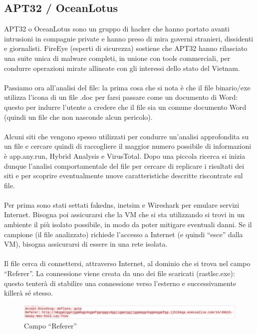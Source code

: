 \documentclass[8pt]{extarticle}
\begin{document}
\subsection{APT32 / OceanLotus}
\noindent
APT32 o OceanLotus sono un gruppo di hacker che hanno portato avanti intrusioni in compagnie private 
e hanno preso di mira governi stranieri, dissidenti e giornalisti. FireEye (esperti di sicurezza) 
sostiene che APT32 hanno rilasciato una suite unica di malware completi, in unione con tools commerciali, 
per condurre operazioni mirate allineate con gli interessi dello stato del Vietnam. \\\\
Passiamo ora all’analisi del file: la prima cosa che si nota è che il file binario/exe utilizza 
l’icona di un file .doc per farsi passare come un documento di Word: questo per indurre l’utente a 
credere che il file sia un comune documento Word (quindi un file che non nasconde alcun pericolo). \\\\
Alcuni siti che vengono spesso utilizzati per condurre un’analisi approfondita su un file e cercare 
quindi di raccogliere il maggior numero possibile di informazioni è app.any.run, Hybrid Analysis e 
VirusTotal. Dopo una piccola ricerca si inizia dunque l’analisi comportamentale del file per cercare 
di replicare i risultati dei siti e per scoprire eventualmente nuove caratteristiche descritte 
riscontrate sul file.\\\\
Per prima sono stati settati fakedns, inetsim e Wireshark per emulare servizi Internet. Bisogna 
poi assicurarsi che la VM che si sta utilizzando si trovi in un ambiente il più isolato possibile, 
in modo da poter mitigare eventuali danni. Se il campione (il file analizzato) richiede l’accesso 
a Internet (e quindi “esce” dalla VM), bisogna assicurarsi di essere in una rete isolata.\\\\
Il file cerca di connettersi, attraverso Internet, al dominio che si trova nel campo “Referer”. 
La connessione viene creata da uno dei file scaricati (rastlsc.exe): questo tenterà di stabilire 
una connessione verso l’esterno e successivamente killerà sé stesso. 
\begin{figure}[H]
    \center
    \includegraphics[scale=0.25]{images/OceanLotus1.png}
    \caption{Campo “Referer”}\label{fig:1}
\end{figure}
\end{document}
